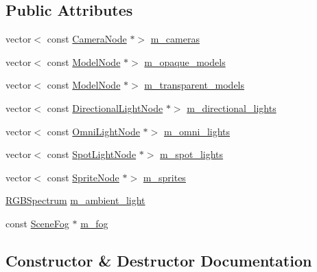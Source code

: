 \subsection*{Public Attributes}
\begin{DoxyCompactItemize}
\item 
vector$<$ const \hyperlink{classmage_1_1_camera_node}{Camera\+Node} $\ast$$>$ \hyperlink{structmage_1_1_pass_buffer_a4885440342be6a2cd11002781704a63f}{m\+\_\+cameras}
\item 
vector$<$ const \hyperlink{classmage_1_1_model_node}{Model\+Node} $\ast$$>$ \hyperlink{structmage_1_1_pass_buffer_a9084c0099c1327ba104081305e40fdbe}{m\+\_\+opaque\+\_\+models}
\item 
vector$<$ const \hyperlink{classmage_1_1_model_node}{Model\+Node} $\ast$$>$ \hyperlink{structmage_1_1_pass_buffer_a6af414efd72ef39b1af84951e56b7860}{m\+\_\+transparent\+\_\+models}
\item 
vector$<$ const \hyperlink{namespacemage_a7637b5351fc0f66a10badd80ebb35899}{Directional\+Light\+Node} $\ast$$>$ \hyperlink{structmage_1_1_pass_buffer_a20f2a4518ea6121e6c9ae0ed9d263435}{m\+\_\+directional\+\_\+lights}
\item 
vector$<$ const \hyperlink{namespacemage_a1724c6e6b6b5ba535cdd967cbbb4a669}{Omni\+Light\+Node} $\ast$$>$ \hyperlink{structmage_1_1_pass_buffer_ab4553bc8afe80eff1f52d511cd23e90b}{m\+\_\+omni\+\_\+lights}
\item 
vector$<$ const \hyperlink{namespacemage_aeed5dee4ff6c591eabb0e9114256df4a}{Spot\+Light\+Node} $\ast$$>$ \hyperlink{structmage_1_1_pass_buffer_a45b9dd8e0ecb9c0110b53a5a744519bb}{m\+\_\+spot\+\_\+lights}
\item 
vector$<$ const \hyperlink{classmage_1_1_sprite_node}{Sprite\+Node} $\ast$$>$ \hyperlink{structmage_1_1_pass_buffer_ad742ad6712a63e9d58621da83a7fb900}{m\+\_\+sprites}
\item 
\hyperlink{structmage_1_1_r_g_b_spectrum}{R\+G\+B\+Spectrum} \hyperlink{structmage_1_1_pass_buffer_a311ad723470aff0ad80c325d9ead07b9}{m\+\_\+ambient\+\_\+light}
\item 
const \hyperlink{structmage_1_1_scene_fog}{Scene\+Fog} $\ast$ \hyperlink{structmage_1_1_pass_buffer_a3691cc52fe3bc5f1c86bf0dad36061d8}{m\+\_\+fog}
\end{DoxyCompactItemize}


\subsection{Constructor \& Destructor Documentation}
\hypertarget{structmage_1_1_pass_buffer_af3625cd3aad45b4001744c7134c3db26}{}\label{structmage_1_1_pass_buffer_af3625cd3aad45b4001744c7134c3db26} 
